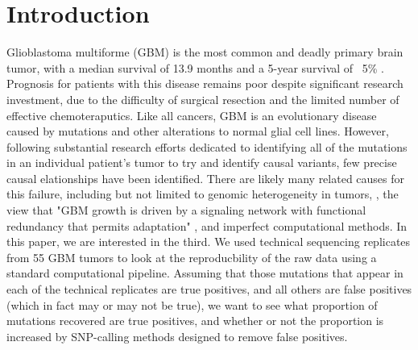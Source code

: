 \documentclass[11pt]{article} %
\begin{document}
\section{Introduction}

Glioblastoma multiforme (GBM) is the most common and deadly primary brain tumor, with a median survival of 13.9 months and a 5-year survival of ~5\% \cite{TCGA-GBM-13}. Prognosis for patients with this disease remains poor despite significant research investment, due to the difficulty of surgical resection and the limited number of effective chemoteraputics. Like all cancers, GBM is an evolutionary disease caused by mutations and other alterations to normal glial cell lines. However, following substantial research efforts dedicated to identifying all of the mutations in an individual patient's tumor to try and identify causal variants, few precise causal elationships have been identified. There are likely many related causes for this failure, including but not limited to genomic heterogeneity in tumors, \cite{ValentineD}, the view that "GBM growth is driven by a signaling network with functional redundancy that permits adaptation" \cite{TCGA-GBM-13}, and imperfect computational methods. 
In this paper, we are interested in the third. We used technical sequencing replicates from 55 GBM tumors to look at the reproducbility of the raw data using a standard computational pipeline. Assuming that those mutations that appear in each of the technical replicates are true positives, and all others are false positives (which in fact may or may not be true), we want to see what proportion of mutations recovered are true positives, and whether or not the proportion is increased by SNP-calling methods designed to remove false positives.
\end{document}
